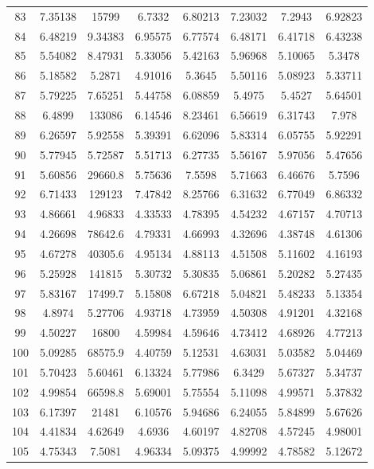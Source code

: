 \begin{center}
\begin{longtable}{cccccccc}
83 & 7.35138 & 15799 & 6.7332 & 6.80213 & 7.23032 & 7.2943 & 6.92823\\
84 & 6.48219 & 9.34383 & 6.95575 & 6.77574 & 6.48171 & 6.41718 & 6.43238\\
85 & 5.54082 & 8.47931 & 5.33056 & 5.42163 & 5.96968 & 5.10065 & 5.3478\\
86 & 5.18582 & 5.2871 & 4.91016 & 5.3645 & 5.50116 & 5.08923 & 5.33711\\
87 & 5.79225 & 7.65251 & 5.44758 & 6.08859 & 5.4975 & 5.4527 & 5.64501\\
88 & 6.4899 & 133086 & 6.14546 & 8.23461 & 6.56619 & 6.31743 & 7.978\\
89 & 6.26597 & 5.92558 & 5.39391 & 6.62096 & 5.83314 & 6.05755 & 5.92291\\
90 & 5.77945 & 5.72587 & 5.51713 & 6.27735 & 5.56167 & 5.97056 & 5.47656\\
91 & 5.60856 & 29660.8 & 5.75636 & 7.5598 & 5.71663 & 6.46676 & 5.7596\\
92 & 6.71433 & 129123 & 7.47842 & 8.25766 & 6.31632 & 6.77049 & 6.86332\\
93 & 4.86661 & 4.96833 & 4.33533 & 4.78395 & 4.54232 & 4.67157 & 4.70713\\
94 & 4.26698 & 78642.6 & 4.79331 & 4.66993 & 4.32696 & 4.38748 & 4.61306\\
95 & 4.67278 & 40305.6 & 4.95134 & 4.88113 & 4.51508 & 5.11602 & 4.16193\\
96 & 5.25928 & 141815 & 5.30732 & 5.30835 & 5.06861 & 5.20282 & 5.27435\\
97 & 5.83167 & 17499.7 & 5.15808 & 6.67218 & 5.04821 & 5.48233 & 5.13354\\
98 & 4.8974 & 5.27706 & 4.93718 & 4.73959 & 4.50308 & 4.91201 & 4.32168\\
99 & 4.50227 & 16800 & 4.59984 & 4.59646 & 4.73412 & 4.68926 & 4.77213\\
100 & 5.09285 & 68575.9 & 4.40759 & 5.12531 & 4.63031 & 5.03582 & 5.04469\\
101 & 5.70423 & 5.60461 & 6.13324 & 5.77986 & 6.3429 & 5.67327 & 5.34737\\
102 & 4.99854 & 66598.8 & 5.69001 & 5.75554 & 5.11098 & 4.99571 & 5.37832\\
103 & 6.17397 & 21481 & 6.10576 & 5.94686 & 6.24055 & 5.84899 & 5.67626\\
104 & 4.41834 & 4.62649 & 4.6936 & 4.60197 & 4.82708 & 4.57245 & 4.98001\\
105 & 4.75343 & 7.5081 & 4.96334 & 5.09375 & 4.99992 & 4.78582 & 5.12672\\
\end{longtable}
\end{center}

